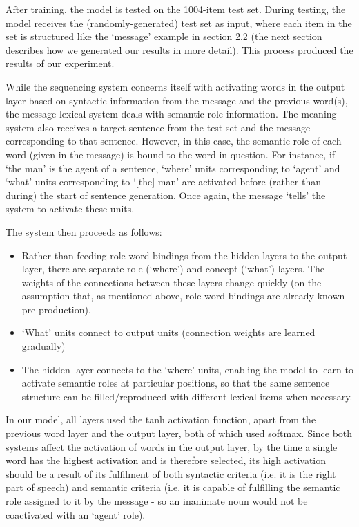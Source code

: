 \documentclass{article}
\begin{document}
After training, the model is tested on the 1004-item test set. During testing, the model receives the (randomly-generated) test set as input, where each item in the set is structured like the `message' example in section 2.2 (the next section describes how we generated our results in more detail). This process produced the results of our experiment.

While the sequencing system concerns itself with activating words in the output layer based on syntactic information from the message and the previous word(s), the message-lexical system deals with semantic role information. The meaning system also receives a target sentence from the test set and the message corresponding to that sentence. However, in this case, the semantic role of each word (given in the message) is bound to the word in question. For instance, if `the man' is the agent of a sentence, `where' units corresponding to `agent' and `what' units corresponding to `[the] man' are activated before (rather than during) the start of sentence generation. Once again, the message `tells' the system to activate these units.

The system then proceeds as follows:
\begin{itemize}
	\item Rather than feeding role-word bindings from the hidden layers to the output layer, there are separate role (`where') and concept (`what') layers. The weights of the connections between these layers change quickly (on the assumption that, as mentioned above, role-word bindings are already known pre-production).
	\item `What' units connect to output units (connection weights are learned gradually)
	\item The hidden layer connects to the `where' units, enabling the model to learn to activate semantic roles at particular positions, so that the same sentence structure can be filled/reproduced with different lexical items when necessary.	
\end{itemize}

In our model, all layers used the tanh activation function, apart from the previous word layer and the output layer, both of which used softmax. Since both systems affect the activation of words in the output layer, by the time a single word has the highest activation and is therefore selected, its high activation should be a result of its fulfilment of both syntactic criteria (i.e. it is the right part of speech) and semantic criteria (i.e. it is capable of fulfilling the semantic role assigned to it by the message - so an inanimate noun would not be coactivated with an `agent' role).
\end{document}
